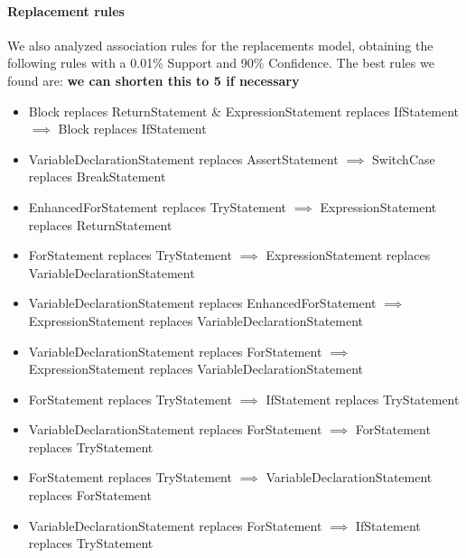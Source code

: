 \documentclass[conference]{IEEEtran}
\newcommand{\todo}[1]
  {{\scriptsize \textbf{\color{red} {#1}}}}
\begin{document}
\paragraph {Replacement rules} We also analyzed association rules for the
replacements model, obtaining
the following rules with a 0.01\% Support and 90\% Confidence. %
The best rules we found are: \todo{we can shorten this to 5 if necessary}
\begin{itemize}
\item Block replaces ReturnStatement \& ExpressionStatement replaces IfStatement $\implies$ Block replaces IfStatement
\item VariableDeclarationStatement replaces AssertStatement $\implies$ SwitchCase replaces BreakStatement
\item EnhancedForStatement replaces TryStatement $\implies$ ExpressionStatement replaces ReturnStatement
\item ForStatement replaces TryStatement $\implies$ ExpressionStatement replaces VariableDeclarationStatement
\item VariableDeclarationStatement replaces EnhancedForStatement $\implies$ ExpressionStatement replaces VariableDeclarationStatement
\item VariableDeclarationStatement replaces ForStatement $\implies$ ExpressionStatement replaces VariableDeclarationStatement
\item ForStatement replaces TryStatement $\implies$ IfStatement replaces TryStatement
\item VariableDeclarationStatement replaces ForStatement $\implies$ ForStatement replaces TryStatement
\item ForStatement replaces TryStatement $\implies$ VariableDeclarationStatement replaces ForStatement
\item VariableDeclarationStatement replaces ForStatement $\implies$ IfStatement replaces TryStatement
\end{itemize}

\end{document}
